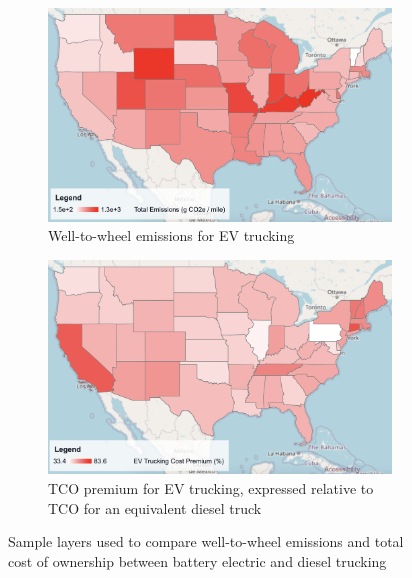 \begin{figure}[ht]
    \centering
    \begin{subfigure}[b]{0.49\textwidth}
        \centering
        \includegraphics[width=\textwidth]{figures/lifecycle_emissions.png}
        \caption{Well-to-wheel emissions for EV trucking\newline}
        \label{fig:lifecycle_emissions}
    \end{subfigure}
    \hfill
    \begin{subfigure}[b]{0.49\textwidth}
        \centering
        \includegraphics[width=\textwidth]{figures/ev_cost_premium.png}
        \caption{TCO premium for EV trucking, expressed relative to TCO for an equivalent diesel truck}
        \label{fig:ev_cost_premium}
    \end{subfigure}
    \caption{Sample layers used to compare well-to-wheel emissions and total cost of ownership between battery electric and diesel trucking}
    \label{fig:truck_costs_emissions}
\end{figure}

